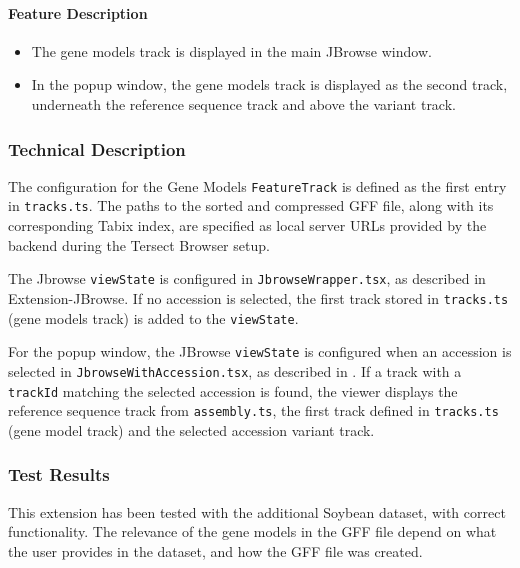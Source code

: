 \documentclass[12pt]{article}
\begin{document}
\begin{itemize}
\paragraph{Feature Description}
\begin{itemize}
    \item The gene models track is displayed in the main JBrowse window. 
    \item In the popup window, the gene models track is displayed as the second track, underneath the reference sequence track and above the variant track.
\end{itemize}

\subsubsection{Technical Description}
The configuration for the Gene Models \verb+FeatureTrack+ is defined as the first entry in \verb+tracks.ts+. The paths to the sorted and compressed GFF file, along with its corresponding Tabix index, are specified as local server URLs provided by the backend during the Tersect Browser setup. 

The Jbrowse \verb+viewState+ is configured in \verb+JbrowseWrapper.tsx+, as described in Extension-JBrowse. If no accession is selected, the first track stored in \verb+tracks.ts+ (gene models track) is added to the \verb+viewState+.

For the popup window, the JBrowse \verb+viewState+ is configured when an accession is selected in \verb+JbrowseWithAccession.tsx+, as described in . If a track with a \verb+trackId+ matching the selected accession is found, the viewer displays the reference sequence track from \verb+assembly.ts+, the first track defined in \verb+tracks.ts+ (gene model track) and the selected accession variant track. 

\subsubsection{Test Results}
This extension has been tested with the additional Soybean dataset, with correct functionality. The relevance of the gene models in the GFF file depend on what the user provides in the dataset, and how the GFF file was created. 


\end{itemize}
\end{document}
